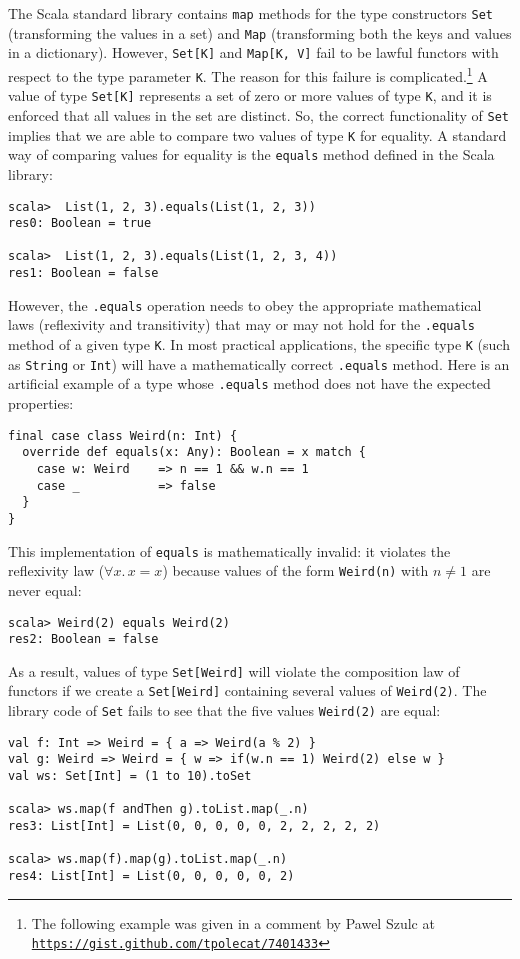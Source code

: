 The Scala standard library contains \lstinline!map! methods for the
type constructors \lstinline!Set! (transforming the values in a set)
and \lstinline!Map! (transforming both the keys and values in a dictionary).
However, \lstinline!Set[K]! and \lstinline!Map[K, V]! fail to be
lawful functors with respect to the type parameter \lstinline!K!.
The reason for this failure is complicated.\footnote{The following example was given in a comment by Pawel Szulc at \texttt{\href{https://gist.github.com/tpolecat/7401433}{https://gist.github.com/tpolecat/7401433}}}
A value of type \lstinline!Set[K]! represents a set of zero or more
values of type \lstinline!K!, and it is enforced that all values
in the set are distinct. So, the correct functionality of \lstinline!Set!
implies that we are able to compare two values of type \lstinline!K!
for equality. A standard way of comparing values for equality is the
\lstinline!equals! method defined in the Scala library:
\begin{lstlisting}
scala>  List(1, 2, 3).equals(List(1, 2, 3))
res0: Boolean = true

scala>  List(1, 2, 3).equals(List(1, 2, 3, 4))
res1: Boolean = false
\end{lstlisting}
However, the \lstinline!.equals! operation needs to obey the appropriate
mathematical laws (reflexivity and transitivity) that may or may not
hold for the \lstinline!.equals! method of a given type \lstinline!K!.
In most practical applications, the specific type \lstinline!K! (such
as \lstinline!String! or \lstinline!Int!) will have a mathematically
correct \lstinline!.equals! method. Here is an artificial example
of a type whose \lstinline!.equals! method does not have the expected
properties:
\begin{lstlisting}
final case class Weird(n: Int) {
  override def equals(x: Any): Boolean = x match {
    case w: Weird    => n == 1 && w.n == 1
    case _           => false
  }
}
\end{lstlisting}
This implementation of \lstinline!equals! is mathematically invalid:
it violates the reflexivity law ($\forall x.\,x=x$) because values
of the form \lstinline!Weird(n)! with $n\neq1$ are never equal:
\begin{lstlisting}
scala> Weird(2) equals Weird(2)
res2: Boolean = false
\end{lstlisting}
As a result, values of type \lstinline!Set[Weird]! will violate the
composition law of functors if we create a \lstinline!Set[Weird]!
containing several values of \lstinline!Weird(2)!. The library code
of \lstinline!Set! fails to see that the five values \lstinline!Weird(2)!
are equal:
\begin{lstlisting}
val f: Int => Weird = { a => Weird(a % 2) }
val g: Weird => Weird = { w => if(w.n == 1) Weird(2) else w }
val ws: Set[Int] = (1 to 10).toSet

scala> ws.map(f andThen g).toList.map(_.n)
res3: List[Int] = List(0, 0, 0, 0, 0, 2, 2, 2, 2, 2)

scala> ws.map(f).map(g).toList.map(_.n)
res4: List[Int] = List(0, 0, 0, 0, 0, 2)
\end{lstlisting}

